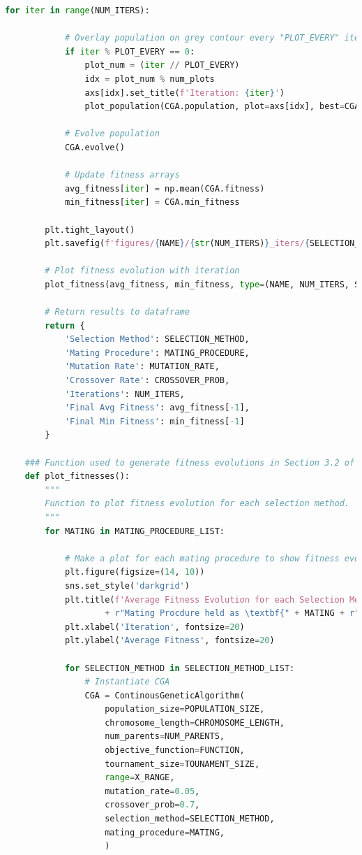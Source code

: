 \documentclass[10pt]{article}
\begin{document}
\begin{lstlisting}[language=Python, caption=CGA\_TuningExperiments.py, label=CGA_TuningExperimentspy]
        for iter in range(NUM_ITERS):
    
            # Overlay population on grey contour every "PLOT_EVERY" iterations. (Periodic break to allow for visualisation).
            if iter % PLOT_EVERY == 0:
                plot_num = (iter // PLOT_EVERY)
                idx = plot_num % num_plots
                axs[idx].set_title(f'Iteration: {iter}')
                plot_population(CGA.population, plot=axs[idx], best=CGA.best_individual)
    
            # Evolve population
            CGA.evolve()
    
            # Update fitness arrays
            avg_fitness[iter] = np.mean(CGA.fitness)
            min_fitness[iter] = CGA.min_fitness
    
        plt.tight_layout()
        plt.savefig(f'figures/{NAME}/{str(NUM_ITERS)}_iters/{SELECTION_METHOD}/{MATING_PROCEDURE}/{MUTATION_RATE}_{CROSSOVER_PROB}_Population.png')
    
        # Plot fitness evolution with iteration
        plot_fitness(avg_fitness, min_fitness, type=(NAME, NUM_ITERS, SELECTION_METHOD, MATING_PROCEDURE, MUTATION_RATE, CROSSOVER_PROB))
    
        # Return results to dataframe
        return {
            'Selection Method': SELECTION_METHOD,
            'Mating Procedure': MATING_PROCEDURE,
            'Mutation Rate': MUTATION_RATE,
            'Crossover Rate': CROSSOVER_PROB,
            'Iterations': NUM_ITERS,
            'Final Avg Fitness': avg_fitness[-1],
            'Final Min Fitness': min_fitness[-1]
        } 
    
    ### Function used to generate fitness evolutions in Section 3.2 of the report ###
    def plot_fitnesses():
        """
        Function to plot fitness evolution for each selection method.
        """
        for MATING in MATING_PROCEDURE_LIST:
    
            # Make a plot for each mating procedure to show fitness evolution for the three selection method
            plt.figure(figsize=(14, 10))
            sns.set_style('darkgrid')
            plt.title(f'Average Fitness Evolution for each Selection Method on {NAME} Function \n' 
                    + r"Mating Procdure held as \textbf{" + MATING + r"}", fontsize=24)
            plt.xlabel('Iteration', fontsize=20)
            plt.ylabel('Average Fitness', fontsize=20)
            
            for SELECTION_METHOD in SELECTION_METHOD_LIST:
                # Instantiate CGA
                CGA = ContinousGeneticAlgorithm(
                    population_size=POPULATION_SIZE,
                    chromosome_length=CHROMOSOME_LENGTH,
                    num_parents=NUM_PARENTS,
                    objective_function=FUNCTION,
                    tournament_size=TOUNAMENT_SIZE,
                    range=X_RANGE,
                    mutation_rate=0.05,
                    crossover_prob=0.7,
                    selection_method=SELECTION_METHOD,
                    mating_procedure=MATING,
                    )
                

\end{lstlisting}
\end{document}

